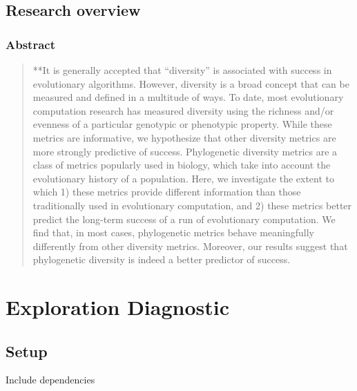 \documentclass[]{book}
\begin{document}
\hypertarget{research-overview}{%
\section{Research overview}\label{research-overview}}

\hypertarget{abstract}{%
\subsection{Abstract}\label{abstract}}

\begin{quote}
**It is generally accepted that ``diversity'' is associated with success in evolutionary algorithms. However, diversity is a broad concept that can be measured and defined in a multitude of ways. To date, most evolutionary computation research has measured diversity using the richness and/or evenness of a particular genotypic or phenotypic property. While these metrics are informative, we hypothesize that other diversity metrics are more strongly predictive of success. Phylogenetic diversity metrics are a class of metrics popularly used in biology, which take into account the evolutionary history of a population. Here, we investigate the extent to which 1) these metrics provide different information than those traditionally used in evolutionary computation, and 2) these metrics better predict the long-term success of a run of evolutionary computation. We find that, in most cases, phylogenetic metrics behave meaningfully differently from other diversity metrics. Moreover, our results suggest that phylogenetic diversity is indeed a better predictor of success.
\end{quote}

\hypertarget{exploration-diagnostic}{%
\chapter{Exploration Diagnostic}\label{exploration-diagnostic}}

\hypertarget{setup}{%
\section{Setup}\label{setup}}

Include dependencies
\end{document}
